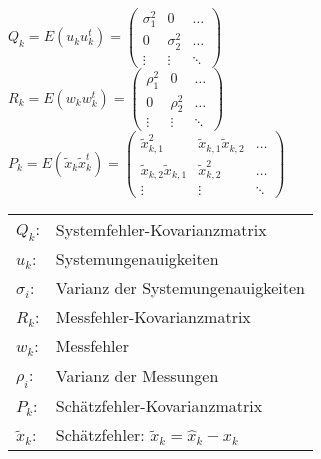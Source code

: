 	\begin{minipage}{8cm}
		$Q_k = E(u_k u_k^t) = \begin{pmatrix} \sigma_1^2 & 0 & \hdots \\
								0 & \sigma_2^2 & \hdots \\
								\vdots & \vdots & \ddots \end{pmatrix}$ \\
		
		$R_k = E(w_k w_k^t) = \begin{pmatrix} \rho_1^2 & 0 & \hdots \\
								0 & \rho_2^2 & \hdots \\
								\vdots & \vdots & \ddots \end{pmatrix}$ \\
		
		$P_k = E(\tilde{x}_k \tilde{x}_k^t) = \begin{pmatrix} 
							\tilde{x}_{k,1}^2 & \tilde{x}_{k,1}\tilde{x}_{k,2} & \hdots \\
							\tilde{x}_{k,2}\tilde{x}_{k,1} & \tilde{x}_{k,2}^2 & \hdots \\
							\vdots & \vdots & \ddots 	\end{pmatrix}$ 
	\end{minipage}
	\begin{minipage}{8cm}
		\begin{tabular}{ll}
				$Q_k$: & Systemfehler-Kovarianzmatrix \\
				$u_k$: & Systemungenauigkeiten \\
				$\sigma_i$: & Varianz der Systemungenauigkeiten \\
				$R_k$: & Messfehler-Kovarianzmatrix \\
				$w_k$: & Messfehler \\
				$\rho_i$: & Varianz der Messungen \\
				$P_k$: & Schätzfehler-Kovarianzmatrix \\
				$\tilde{x}_k$: & Schätzfehler: $\tilde{x}_k=\hat{x}_k-x_k$ \\
		\end{tabular}
	\end{minipage}
	
